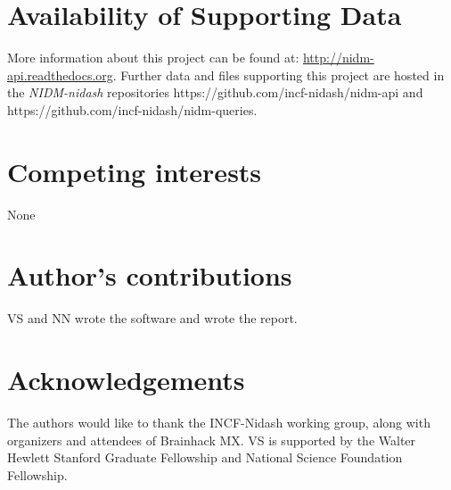 \documentclass[twocolumn]{bmcart}%
\begin{document}
\begin{backmatter}

\section*{Availability of Supporting Data}
More information about this project can be found at: \url{http://nidm-api.readthedocs.org}. Further data and files supporting this project are hosted in the \emph{NIDM-nidash} repositories https://github.com/incf-nidash/nidm-api and https://github.com/incf-nidash/nidm-queries.

\section*{Competing interests}
None

\section*{Author's contributions}
VS and NN wrote the software and wrote the report.

\section*{Acknowledgements}
The authors would like to thank the INCF-Nidash working group, along with organizers and attendees of
Brainhack MX. VS is supported by the Walter Hewlett Stanford Graduate Fellowship and National Science Foundation Fellowship.
  
  


\end{backmatter}
\end{document}
